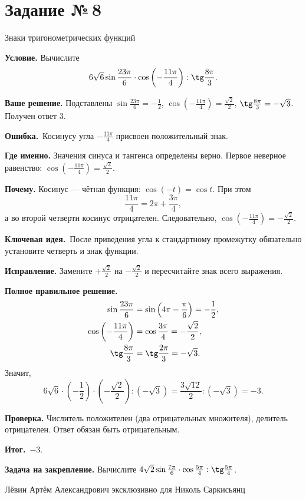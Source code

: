 \documentclass[a4paper,11pt]{article}
\newcommand{\Hdr}[1]{\par\vspace{2pt}\noindent\textbf{#1}\quad}
\newcommand{\E}{\par\smallskip\noindent\textcolor{errorred}{\textbf{Ошибка.}}\ }
\newcommand{\K}{\par\smallskip\noindent\textcolor{accent}{\textbf{Ключевая идея.}}\ }
\newcommand{\I}{\par\smallskip\noindent\textcolor{accent}{\textbf{Итог.}}\ }
\newcommand{\Task}[2]{\clearpage\phantomsection\label{task:#1}\section*{Задание №\,#1}\textcolor{accent}{#2}\par\vspace{7pt}}
\newcommand{\Footer}{\par\vfill\begin{center}\footnotesize\color{ink}Лёвин Артём Александрович эксклюзивно для Николь Саркисьянц\end{center}}
\begin{document}
\Task{8}{Знаки тригонометрических функций}
\Hdr{Условие.} Вычислите
\[6\sqrt6\sin\frac{23\pi}{6}\cdot\cos\left(-\frac{11\pi}{4}\right):\tg\frac{8\pi}{3}.\]
\Hdr{Ваше решение.} Подставлены $\sin\frac{23\pi}{6}=-\frac12$, $\cos(-\frac{11\pi}{4})=\frac{\sqrt2}{2}$, $\tg\frac{8\pi}{3}=-\sqrt3$. Получен ответ $3$.
\E Косинусу угла $-\frac{11\pi}{4}$ присвоен положительный знак.
\Hdr{Где именно.} Значения синуса и тангенса определены верно. Первое неверное равенство: $\cos(-\frac{11\pi}{4})=\frac{\sqrt2}{2}$.
\Hdr{Почему.} Косинус --- чётная функция: $\cos(-t)=\cos t$. При этом
\[\frac{11\pi}{4}=2\pi+\frac{3\pi}{4},\]
а во второй четверти косинус отрицателен. Следовательно, $\cos(-\frac{11\pi}{4})=-\frac{\sqrt2}{2}$.
\K После приведения угла к стандартному промежутку обязательно установите четверть и знак функции.
\Hdr{Исправление.} Замените $+\frac{\sqrt2}{2}$ на $-\frac{\sqrt2}{2}$ и пересчитайте знак всего выражения.
\Hdr{Полное правильное решение.}
\[
\begin{aligned}
\sin\frac{23\pi}{6}&=\sin\left(4\pi-\frac\pi6\right)=-\frac12,\\
\cos\left(-\frac{11\pi}{4}\right)&=\cos\frac{3\pi}{4}=-\frac{\sqrt2}{2},\\
\tg\frac{8\pi}{3}&=\tg\frac{2\pi}{3}=-\sqrt3.
\end{aligned}
\]
Значит,
\[
6\sqrt6\cdot\left(-\frac12\right)\cdot\left(-\frac{\sqrt2}{2}\right):(-\sqrt3)
=\frac{3\sqrt{12}}{2}:(-\sqrt3)=\boxed{-3}.
\]
\Hdr{Проверка.} Числитель положителен (два отрицательных множителя), делитель отрицателен. Ответ обязан быть отрицательным.
\I $-3$.
\Hdr{Задача на закрепление.} Вычислите $4\sqrt2\sin\frac{7\pi}{6}\cdot\cos\frac{5\pi}{4}:\tg\frac{5\pi}{4}$.
\Footer
\end{document}
